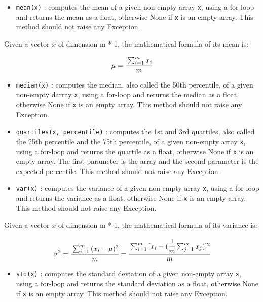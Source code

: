 \documentclass[]{article}
\providecommand{\tightlist}{%
  \setlength{\itemsep}{0pt}\setlength{\parskip}{0pt}}
\begin{document}
\begin{itemize}
\tightlist
\item
  \texttt{mean(x)} : computes the mean of a given non-empty array
  \texttt{x}, using a for-loop and returns the mean as a float,
  otherwise None if \texttt{x} is an empty array. This method should not
  raise any Exception.
\end{itemize}

Given a vector \(x\) of dimension m * 1, the mathematical formula of its
mean is:

\large

\[
\mu = \cfrac{\sum_{i = 1}^{m}{x_i}}{m}
\] \normalsize

\begin{itemize}
\item
  \texttt{median(x)} : computes the median, also called the 50th
  percentile, of a given non-empty darray \texttt{x}, using a for-loop
  and returns the median as a float, otherwise None if \texttt{x} is an
  empty array. This method should not raise any Exception.
\item
  \texttt{quartiles(x,\ percentile)} : computes the 1st and 3rd
  quartiles, also called the 25th percentile and the 75th percentile, of
  a given non-empty array \texttt{x}, using a for-loop and returns the
  quartile as a float, otherwise None if \texttt{x} is an empty array.
  The first parameter is the array and the second parameter is the
  expected percentile. This method should not raise any Exception.
\item
  \texttt{var(x)} : computes the variance of a given non-empty array
  \texttt{x}, using a for-loop and returns the variance as a float,
  otherwise None if \texttt{x} is an empty array. This method should not
  raise any Exception.
\end{itemize}

Given a vector \(x\) of dimension m * 1, the mathematical formula of its
variance is:

\large

\[
\sigma^2 = \cfrac{\sum_{i = 1}^{m}{(x_i - \mu)^2}}{m} = \cfrac{\sum_{i = 1}^{m}{[x_i - (\cfrac{1}{m}\sum_{j = 1}^{m}{x_j}})]^2}{m}
\] \normalsize

\begin{itemize}
\tightlist
\item
  \texttt{std(x)} : computes the standard deviation of a given non-empty
  array \texttt{x}, using a for-loop and returns the standard deviation
  as a float, otherwise None if \texttt{x} is an empty array. This
  method should not raise any Exception.
\end{itemize}
\end{document}
